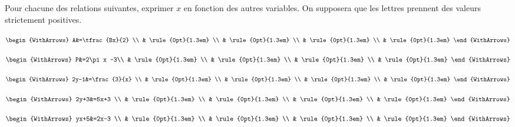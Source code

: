 \begin{example}  
Pour chacune des relations suivantes, exprimer $x$ en fonction des autres variables. On supposera que les lettres prennent des valeurs strictement positives.

\noindent \parbox{0.16\linewidth}{	
	$\begin{WithArrows}
		A&=\tfrac{Bx}{2}  \\ 
		& \rule{0pt}{1.3em}  \\
		&  \rule{0pt}{1.3em} \\
		&   \rule{0pt}{1.3em} \\
		&   \rule{0pt}{1.3em} 
	\end{WithArrows}$ 	
}\hfill \parbox{0.16\linewidth}{	
	$\begin{WithArrows}
		P&=2\pi x -3\\ 
		& \rule{0pt}{1.3em}  \\
		&  \rule{0pt}{1.3em} \\
		&   \rule{0pt}{1.3em} \\
		&   \rule{0pt}{1.3em} 
	\end{WithArrows}$ 	
} \hfill \parbox{0.19\linewidth}{	
	$\begin{WithArrows}
		2y-1&=\frac{3}{x} \\ 
		& \rule{0pt}{1.3em}  \\
		&  \rule{0pt}{1.3em} \\
		&   \rule{0pt}{1.3em}  \\
		&   \rule{0pt}{1.3em}
	\end{WithArrows}$ 	
}\hfill \parbox{0.19\linewidth}{	
	$\begin{WithArrows}
		2y+3&=5x+3 \\ 
		& \rule{0pt}{1.3em}  \\
		&  \rule{0pt}{1.3em} \\
		&   \rule{0pt}{1.3em}  \\
		&   \rule{0pt}{1.3em}
	\end{WithArrows}$ 	
} \hfill \parbox{0.22\linewidth}{	
$\begin{WithArrows}
	yx+5&=2x-3 \\ 
	& \rule{0pt}{1.3em}  \\
	&  \rule{0pt}{1.3em} \\
	&   \rule{0pt}{1.3em} \\
	&   \rule{0pt}{1.3em}  
\end{WithArrows}$ 	
} 	 
\end{example}

